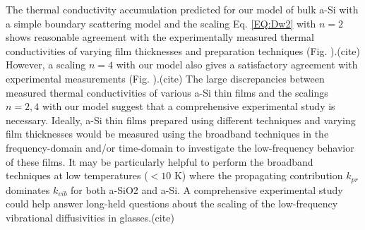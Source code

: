 \documentclass[aps,prb,twocolumn,superscriptaddress,footinbib,amsmath,amssymb,floatfix]{revtex4}
\begin{document}
The thermal conductivity accumulation predicted for our model of bulk 
a-Si with a simple boundary scattering model and the scaling 
Eq. \eqref{EQ:Dw2} with $n=2$ shows reasonable agreement 
with the experimentally measured thermal conductivities 
of varying film thicknesses and preparation techniques (Fig. ).(cite) 
However, a scaling $n=4$ with our model also gives 
a satisfactory agreement with experimental measurements (Fig. ).(cite) 
The large discrepancies between measured 
thermal conductivities of various a-Si thin films and 
the scalings $n=2,4$ with our model suggest that a comprehensive 
experimental study is necessary. Ideally, a-Si thin films  
prepared using different techniques and varying film thicknesses 
would be measured using the broadband techniques in the frequency-domain 
and/or time-domain to investigate the low-frequency behavior of 
these films.\cite{koh_frequency_2007,siemens_quasi-ballistic_2010,
minnich_thermal_2011,regner_broadband_2013}
It may be particularly helpful to perform the broadband techniques at 
low temperatures ($< 10$ K) where the propagating contribution 
$k_{pr}$ dominates $k_{vib}$ for both a-SiO2 and a-Si. 
A comprehensive experimental study could help answer long-held 
questions about the scaling of the low-frequency vibrational 
diffusivities in glasses.(cite) 

\clearpage


\end{document}
